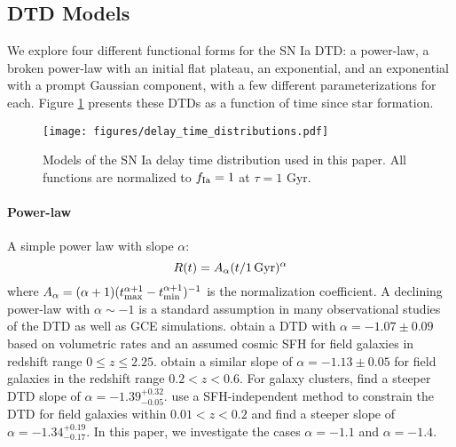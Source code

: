 \documentclass[twocolumn,linenumbers,twocolappendix]{aastex631}
\begin{document}
\subsection{DTD Models}
\label{sec:dtd-models}

We explore four different functional forms for the SN Ia DTD: a power-law, a broken power-law with an initial flat plateau, an exponential, and an exponential with a prompt Gaussian component, with a few different parameterizations for each. Figure \ref{fig:dtds} presents these DTDs as a function of time since star formation.

\begin{figure}
    \centering
    \texttt{[image: figures/delay\_time\_distributions.pdf]}
    \caption{Models of the SN Ia delay time distribution used in this paper. All functions are normalized to $f_{\rm Ia}=1$ at $\tau=1$ Gyr.}
    \label{fig:dtds}
\end{figure}


\paragraph{Power-law} A simple power law with slope $\alpha$:
\begin{equation}
    R(t) = A_\alpha (t/1\,\rm{Gyr})^\alpha
    \label{eq:powerlaw-dtd}
\end{equation}
where $A_\alpha = (\alpha+1)(t_{\rm max}^{\alpha+1} - t_{\rm min}^{\alpha+1})^{-1}$ is the normalization coefficient.
A declining power-law with $\alpha\sim-1$ is a standard assumption in many observational studies of the DTD as well as GCE simulations. \citet{Maoz2017-CosmicDTD} obtain a DTD with $\alpha=-1.07\pm0.09$ based on volumetric rates and an assumed cosmic SFH for field galaxies in redshift range $0\leq z\leq 2.25$. \citet{Wiseman2021-DESRates} obtain a similar slope of $\alpha=-1.13\pm0.05$ for field galaxies in the redshift range $0.2<z<0.6$. For galaxy clusters, \citet{Maoz2017-CosmicDTD} find a steeper DTD slope of $\alpha=-1.39^{+0.32}_{-0.05}$. \citet{Heringer2019-FieldGalaxyDTD} use a SFH-independent method to constrain the DTD for field galaxies within $0.01<z<0.2$ and find a steeper slope of $\alpha=-1.34^{+0.19}_{-0.17}$.
In this paper, we investigate the cases $\alpha=-1.1$ and $\alpha=-1.4$.
\end{document}
